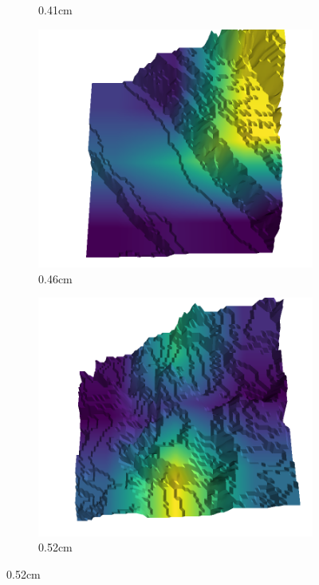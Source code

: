 \documentclass[../document.tex]{subfiles}
\begin{document}
\begin{figure}[H]
\begin{subfigure}[b]{0.192\linewidth}
    \caption{0.41cm}
    \label{fig : quarry-false_positive-17}
    \end{subfigure}
    \begin{subfigure}[b]{0.192\linewidth}
    \includegraphics[width=\linewidth]{../img/5/quarry/false_positive/46-patch-3d-majavi-colormap-216.png}
    \caption{0.46cm}
    \label{fig : quarry-false_positive-18}
    \end{subfigure}
    \begin{subfigure}[b]{0.192\linewidth}
    \includegraphics[width=\linewidth]{../img/5/quarry/false_positive/51-patch-3d-majavi-colormap-228.png}
    \caption{0.52cm}
    \label{fig : quarry-false_positive-19}
    \end{subfigure}
    \label{fig : quarry-false_positive}
    \end{figure}
\end{document}
